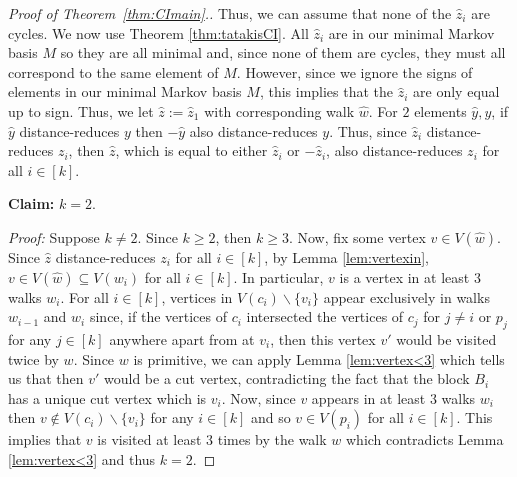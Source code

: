 \documentclass[a4paper, 12pt]{article}
\theoremstyle{plain}
\theoremstyle{definition}
\theoremstyle{remark}
\begin{document}
\begin{proof}[Proof of Theorem~\ref{thm:CImain}.]
    Thus, we can assume that none of the $\hat z_i$ are cycles. We now use Theorem \ref{thm:tatakisCI}. All $\hat z_i$ are in our minimal Markov basis $M$ so they are all minimal and, since none of them are cycles, they must all correspond to the same element of $M$. However, since we ignore the signs of elements in our minimal Markov basis $M$, this implies that the $\hat z_i$ are only equal up to sign. Thus, we let $\hat z :=\hat z_1$ with corresponding walk $\hat w$. For $2$ elements $\hat y,y$, if $\hat y$ distance-reduces $y$ then $-\hat y$ also distance-reduces $y$. Thus, since $\hat z_i$ distance-reduces $z_i$, then $\hat z$, which is equal to either $\hat z_i$ or $-\hat z_i$, also distance-reduces $z_i$ for all $i \in [k]$. 
    
\vspace{2mm}
\textbf{Claim:} $k=2$.

\textit{Proof:} Suppose $k \neq 2$. Since $k \ge 2$, then $k \ge 3$. Now, fix some vertex $v \in V(\hat w)$. Since $\hat z$ distance-reduces $z_i$ for all $i \in [k]$, by Lemma \ref{lem:vertexin}, $v \in V(\hat w) \subseteq V(w_i)$ for all $i \in[k]$. In particular, $v$ is a vertex in at least $3$ walks $w_i$. For all $i \in [k]$, vertices in $ V(c_i) \backslash \{v_i\}$ appear exclusively in walks $w_{i-1}$ and $w_i$ since, if the vertices of $c_i$ intersected the vertices of $c_j$ for $j \neq i$ or $p_j$ for any $j \in [k]$ anywhere apart from at $v_i$, then this vertex $v'$ would be visited twice by $w$. Since $w$ is primitive, we can apply Lemma \ref{lem:vertex<3} which tells us that then $v'$ would be a cut vertex, contradicting the fact that the block $B_i$ has a unique cut vertex which is $v_i$. Now, since $v$ appears in at least $3$ walks $w_i$ then $v \not\in V(c_i) \backslash \{v_i\}$ for any $i \in [k]$ and so $v \in V(p_i)$ for all $i \in [k]$. This implies that $v$ is visited at least $3$ times by the walk $w$ which contradicts Lemma \ref{lem:vertex<3} and thus $k=2$.
\vspace{2mm}


\end{proof}
\end{document}
